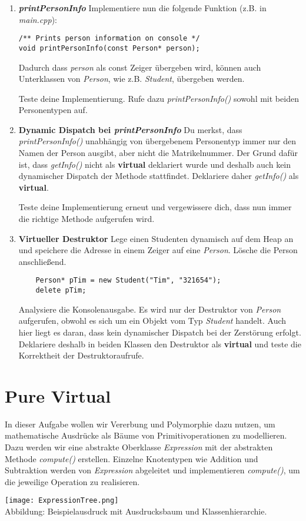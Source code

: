 \begin{enumerate}
\item\textbf{\emph{printPersonInfo}}
Implementiere nun die folgende Funktion (z.B. in \emph{main.cpp}):
\begin{lstlisting}
/** Prints person information on console */
void printPersonInfo(const Person* person);
\end{lstlisting}

Dadurch dass \emph{person} als const Zeiger übergeben wird, können auch Unterklassen von \emph{Person}, wie z.B. \emph{Student}, übergeben werden. 

Teste deine Implementierung. 
Rufe dazu \emph{printPersonInfo()} sowohl mit beiden Personentypen auf.

\item \textbf{Dynamic Dispatch bei \emph{printPersonInfo}}
Du merkst, dass \emph{printPersonInfo()} unabhängig von übergebenem Personentyp immer nur den Namen der Person ausgibt, aber nicht die Matrikelnummer.
Der Grund dafür ist, dass \emph{getInfo()} nicht als \textbf{virtual} deklariert wurde und deshalb auch kein dynamischer Dispatch der Methode stattfindet.
Deklariere daher \emph{getInfo()} als \textbf{virtual}.

Teste deine Implementierung erneut und vergewissere dich, dass nun immer die richtige Methode aufgerufen wird.

\item \textbf{Virtueller Destruktor}
Lege einen Studenten dynamisch auf dem Heap an und speichere die Adresse  in einem Zeiger auf eine \emph{Person}.
Lösche die Person anschließend.
\begin{lstlisting}
	Person* pTim = new Student("Tim", "321654");
	delete pTim;
\end{lstlisting}

Analysiere die Konsolenausgabe.
Es wird nur der Destruktor von \emph{Person} aufgerufen, obwohl es sich um ein Objekt vom Typ \emph{Student} handelt.
Auch hier liegt es daran, dass kein dynamischer Dispatch bei der Zerstörung erfolgt.
Deklariere deshalb in beiden Klassen den Destruktor als \textbf{virtual} und teste die Korrektheit der Destruktoraufrufe.

\end{enumerate}


\section{Pure Virtual}
In dieser Aufgabe wollen wir Vererbung und Polymorphie dazu nutzen, um mathematische Ausdrücke als Bäume von Primitivoperationen zu modellieren.
Dazu werden wir eine abstrakte Oberklasse \emph{Expression} mit der abstrakten Methode \emph{compute()} erstellen.
Einzelne Knotentypen wie Addition und Subtraktion werden von \emph{Expression} abgeleitet und implementieren \emph{compute()}, um die jeweilige Operation zu realisieren.
\begin{center}
	\texttt{[image: ExpressionTree.png]}\\
	Abbildung: Beispielausdruck mit Ausdrucksbaum und Klassenhierarchie.
\end{center}

